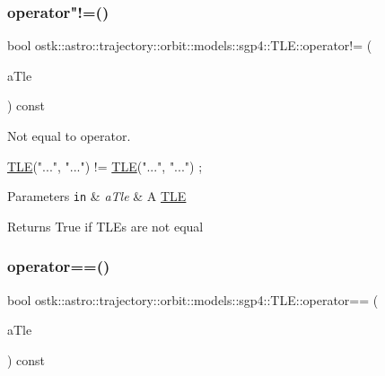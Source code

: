 \subsubsection{\texorpdfstring{operator"!=()}{operator!=()}}
{\footnotesize\ttfamily bool ostk\+::astro\+::trajectory\+::orbit\+::models\+::sgp4\+::\+T\+L\+E\+::operator!= (\begin{DoxyParamCaption}\item[{const \hyperlink{classostk_1_1astro_1_1trajectory_1_1orbit_1_1models_1_1sgp4_1_1_t_l_e}{T\+LE} \&}]{a\+Tle }\end{DoxyParamCaption}) const}



Not equal to operator. 


\begin{DoxyCode}
\hyperlink{classostk_1_1astro_1_1trajectory_1_1orbit_1_1models_1_1sgp4_1_1_t_l_e_a57323db2c24577c2e8ddce79fa776d1e}{TLE}(\textcolor{stringliteral}{"..."}, \textcolor{stringliteral}{"..."}) != \hyperlink{classostk_1_1astro_1_1trajectory_1_1orbit_1_1models_1_1sgp4_1_1_t_l_e_a57323db2c24577c2e8ddce79fa776d1e}{TLE}(\textcolor{stringliteral}{"..."}, \textcolor{stringliteral}{"..."}) ;
\end{DoxyCode}



\begin{DoxyParams}[1]{Parameters}
\mbox{\tt in}  & {\em a\+Tle} & A \hyperlink{classostk_1_1astro_1_1trajectory_1_1orbit_1_1models_1_1sgp4_1_1_t_l_e}{T\+LE} \\
\hline
\end{DoxyParams}
\begin{DoxyReturn}{Returns}
True if T\+L\+Es are not equal 
\end{DoxyReturn}
\mbox{\label{classostk_1_1astro_1_1trajectory_1_1orbit_1_1models_1_1sgp4_1_1_t_l_e_a415bc7b3671eaa616dfd9e82f9fb9520}} 
\subsubsection{\texorpdfstring{operator==()}{operator==()}}
{\footnotesize\ttfamily bool ostk\+::astro\+::trajectory\+::orbit\+::models\+::sgp4\+::\+T\+L\+E\+::operator== (\begin{DoxyParamCaption}\item[{const \hyperlink{classostk_1_1astro_1_1trajectory_1_1orbit_1_1models_1_1sgp4_1_1_t_l_e}{T\+LE} \&}]{a\+Tle }\end{DoxyParamCaption}) const}



